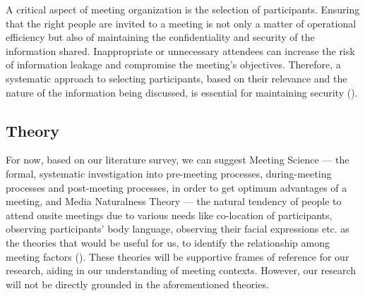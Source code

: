 \begin{spacing}{1.0}
    \par A critical aspect of meeting organization is the selection of participants. Ensuring that the right people are invited to a meeting is not only a matter of operational efficiency but also of maintaining the confidentiality and security of the information shared. Inappropriate or unnecessary attendees can increase the risk of information leakage and compromise the meeting's objectives. Therefore, a systematic approach to selecting participants, based on their relevance and the nature of the information being discussed, is essential for maintaining security (\cite{condeco2024}).

    \subsection{Theory}
    \indent \par For now, based on our literature survey, we can suggest Meeting Science --- the formal, systematic investigation into pre-meeting processes, during-meeting processes and post-meeting processes, in order to get optimum advantages of a meeting, and Media Naturalness Theory --- the natural tendency of people to attend onsite meetings due to various needs like co-location of participants, observing participants' body language, observing their facial expressions etc. as the theories that would be useful for us, to identify the relationship among meeting factors (\cite{karl2021}). These theories will be supportive frames of reference for our research, aiding in our understanding of meeting contexts. However, our research will not be directly grounded in the aforementioned theories.


\end{spacing}
